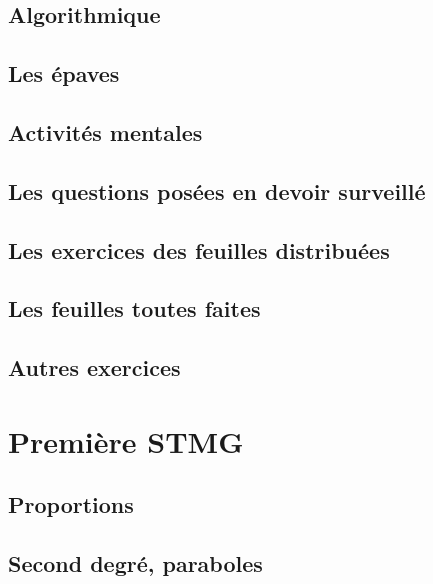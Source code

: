 \documentclass[a4paper,12pt]{book}
\begin{document}
\chapter{Algorithmique}


\chapter{Les épaves}


\chapter{Activités mentales}


\chapter{Les questions posées en devoir surveillé}


\chapter{Les exercices des feuilles distribuées}


\chapter{Les feuilles toutes faites}


\chapter{Autres exercices}


\part{Première STMG}
\chapter{Proportions}


\chapter{Second degré, paraboles}

\end{document}
